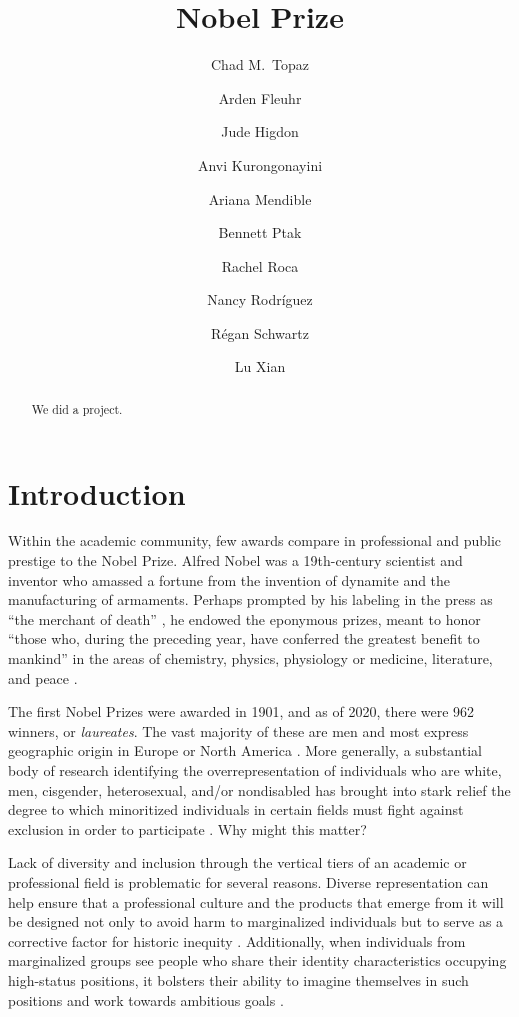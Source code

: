 \documentclass[11pt]{article}
\title{Nobel Prize}
\author[1,2,3,*]{Chad M.\ Topaz}
\author[2]{Arden Fleuhr}
\author[1,4]{Jude Higdon}
\author[2]{Anvi Kurongonayini}
\author[5]{Ariana Mendible}
\author[2]{Bennett Ptak}
\author[6]{Rachel Roca}
\author[3]{Nancy Rodr\'{i}guez}
\author[2]{R\'{e}gan Schwartz}
\author[7]{Lu Xian}
\affil[1]{QSIDE Institute}
\affil[2]{Williams College}
\affil[3]{University of Colorado--Boulder}
\affil[4]{Bennington College}
\affil[5]{Seattle University}
\affil[6]{Michigan State University}
\affil[7]{University of Michigan}
\affil[*]{Corresponding author: chad.topaz@gmail.com}
\begin{document}
\maketitle

\begin{abstract}
We did a project.
\end{abstract}

\section{Introduction}
\label{sec:introduction}

Within the academic community, few awards compare in professional and public prestige to the Nobel Prize. Alfred Nobel was a 19th-century scientist and inventor who amassed a fortune from the invention of dynamite and the manufacturing of armaments. Perhaps prompted by his labeling in the press as ``the merchant of death'' \citep{Gol2000}, he endowed the eponymous prizes, meant to honor ``those who, during the preceding year, have conferred the greatest benefit to mankind'' in the areas of chemistry, physics, physiology or medicine, literature, and peace \citep{NobelPrizeWebsiteFull}.

The first Nobel Prizes were awarded in 1901, and as of 2020, there were 962 winners, or \emph{laureates}. The vast majority of these are men \citep{LunJenJau2019} and most express geographic origin in Europe or North America \citep{Fis2013}. More generally, a substantial body of research identifying the overrepresentation of individuals who are white, men, cisgender, heterosexual, and/or nondisabled has brought into stark relief the degree to which minoritized individuals in certain fields must fight against exclusion in order to participate \citep{TopSen2016, TopKliBer2019, LarTay2020, ACTReport, TopHigEpp2022}. Why might this matter?

Lack of diversity and inclusion through the vertical tiers of an academic or professional field is problematic for several reasons. Diverse representation can help ensure that a professional culture and the products that emerge from it will be designed not only to avoid harm to marginalized individuals but to serve as a corrective factor for historic inequity \citep{ACTReport,WilMilKas2021}. Additionally, when individuals from marginalized groups see people who share their identity characteristics occupying high-status positions, it bolsters their ability to imagine themselves in such positions and work towards ambitious goals \citep{OysBybTer2006, WilMilKas2021}.
\end{document}

